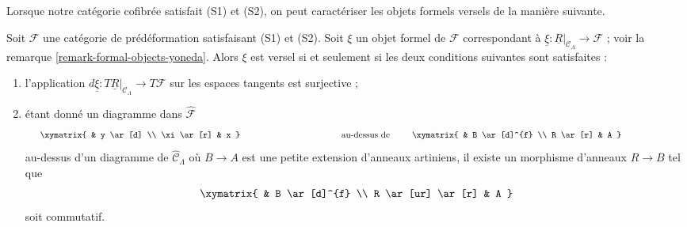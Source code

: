 \noindent
Lorsque notre catégorie cofibrée satisfait (S1) et (S2), on peut caractériser
les objets formels versels de la manière suivante.

\begin{lemma}
\label{lemma-versal-criterion}
Soit $\mathcal{F}$ une catégorie de prédéformation satisfaisant (S1) et (S2).
Soit $\xi$ un objet formel de $\mathcal{F}$ correspondant à
$\underline{\xi} : \underline{R}|_{\mathcal{C}_\Lambda} \to \mathcal{F}$ ;
voir la remarque \ref{remark-formal-objects-yoneda}. Alors $\xi$ est versel
si et seulement si les deux conditions suivantes sont satisfaites :
\begin{enumerate}
\item l'application
$d\underline{\xi} : T\underline{R}|_{\mathcal{C}_\Lambda} \to T\mathcal{F}$
sur les espaces tangents est surjective ;
\item étant donné un diagramme dans $\widehat{\mathcal{F}}$
$$
\vcenter{
\xymatrix{
            &  y \ar[d] \\
\xi \ar[r]  &  x
}
}
\quad\text{au-dessus de}\quad
\vcenter{
\xymatrix{
         &   B  \ar[d]^{f} \\
R \ar[r] &   A
}
}
$$
au-dessus d'un diagramme de $\widehat{\mathcal{C}}_\Lambda$ où $B \to A$ est
une petite extension d'anneaux artiniens, il existe un morphisme d'anneaux
$R \to B$ tel que
$$
\xymatrix{
         &   B  \ar[d]^{f} \\
R \ar[ur] \ar[r] &   A
}
$$
soit commutatif.
\end{enumerate}
\end{lemma}

